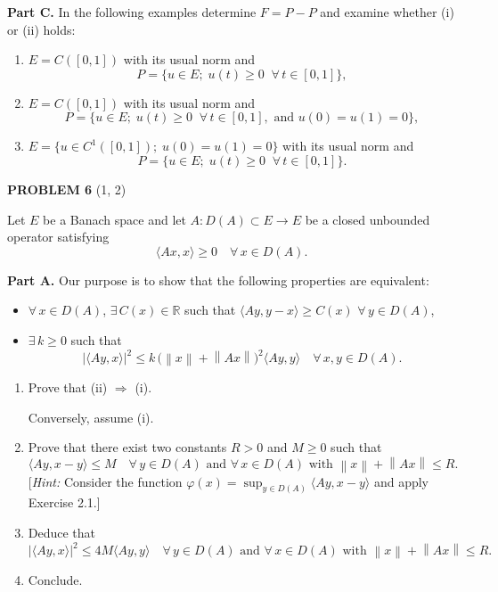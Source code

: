 \documentclass[12pt]{article}
\newcommand{\norm}[1]{\left\|#1\right\|}
\newcommand{\abs}[1]{\left|#1\right|}
\newcommand{\ip}[2]{\langle #1, #2 \rangle}
\newcommand{\R}{\mathbb{R}}
\begin{document}
\noindent\textbf{Part C.} In the following examples determine $F = P - P$ and examine whether (i) or (ii) holds:
\begin{enumerate}
\item[(a)] $E = C([0,1])$ with its usual norm and
\[
P = \{u \in E;\; u(t) \ge 0\;\;\forall\, t \in [0,1]\},
\]
\item[(b)] $E = C([0,1])$ with its usual norm and
\[
P = \{u \in E;\; u(t) \ge 0\;\;\forall\, t \in [0,1],\text{ and } u(0) = u(1) = 0\},
\]
\item[(c)] $E = \{u \in C^1([0,1]);\; u(0) = u(1) = 0\}$ with its usual norm and
\[
P = \{u \in E;\; u(t) \ge 0\;\;\forall\, t \in [0,1]\}.
\]
\end{enumerate}

\bigskip

\noindent\textbf{PROBLEM 6} (1, 2)

\medskip

Let $E$ be a Banach space and let $A : D(A) \subset E \to E$ be a closed unbounded
operator satisfying
\[
\ip{Ax}{x} \ge 0 \quad \forall\, x \in D(A).
\]

\noindent\textbf{Part A.} Our purpose is to show that the following properties are equivalent:
\begin{itemize}
\item[(i)] $\forall\, x \in D(A)$, $\exists\, C(x) \in \R$ such that $\ip{Ay}{y-x} \ge C(x)$ $\forall\, y \in D(A)$,
\item[(ii)] $\exists\, k \ge 0$ such that
\[
\abs{\ip{Ay}{x}}^2 \le k\,\bigl(\norm{x} + \norm{Ax}\bigr)^2 \ip{Ay}{y} \quad \forall\, x, y \in D(A).
\]
\end{itemize}

\begin{enumerate}
\item Prove that (ii) $\Rightarrow$ (i).

Conversely, assume (i).

\item Prove that there exist two constants $R > 0$ and $M \ge 0$ such that
\[
\ip{Ay}{x-y} \le M \quad \forall\, y \in D(A) \text{ and }
\forall\, x \in D(A) \text{ with } \norm{x} + \norm{Ax} \le R.
\]
[\textit{Hint:} Consider the function $\varphi(x) = \sup_{y \in D(A)}\ip{Ay}{x-y}$ and apply Exercise 2.1.]

\item Deduce that
\[
\abs{\ip{Ay}{x}}^2 \le 4M\ip{Ay}{y} \quad \forall\, y \in D(A)
\text{ and } \forall\, x \in D(A) \text{ with } \norm{x} + \norm{Ax} \le R.
\]

\item Conclude.
\end{enumerate}
\end{document}
